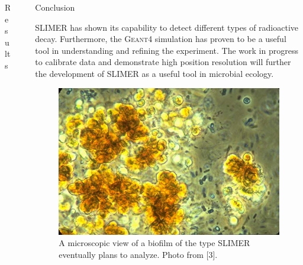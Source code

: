 \documentclass[final]{beamer}
\newlength{\sepwid}
\newlength{\onecolwid}
\newlength{\twocolwid}
\begin{document}
\begin{frame}[t]
\begin{columns}[t]
\begin{column}{\twocolwid}
\begin{columns}[t,totalwidth=\twocolwid]
\begin{column}{\onecolwid}
\begin{block}{Results}
\end{block}


\end{column} %

\end{columns} %

\end{column} %

\begin{column}{\sepwid}\end{column} %

\begin{column}{\onecolwid} %


\begin{block}{Conclusion}

SLIMER has shown its capability to detect different types of radioactive decay. Furthermore, the G\textsc{eant}4 simulation has proven to be a useful tool in understanding and refining the experiment. The work in progress to calibrate data and demonstrate high position resolution will further the development of SLIMER as a useful tool in microbial ecology.

\end{block}

\begin{figure}
\includegraphics[width=0.8\linewidth]{alpinebiofilm.jpg}
\caption{A microscopic view of a biofilm of the type SLIMER eventually plans to analyze. Photo from [3].}
\label{fig:biofilm}
\end{figure}


\end{column}
\end{columns}
\end{frame}
\end{document}
